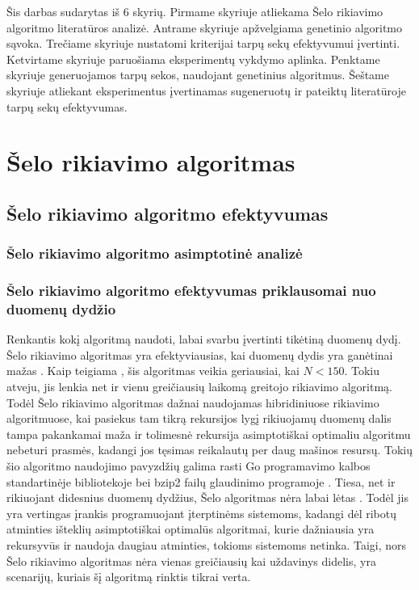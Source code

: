 \documentclass{VUMIFInfKursinis}
\begin{document}
Šis darbas sudarytas iš 6 skyrių.
Pirmame skyriuje atliekama Šelo rikiavimo algoritmo literatūros analizė.
Antrame skyriuje apžvelgiama genetinio algoritmo sąvoka.
Trečiame skyriuje nustatomi kriterijai tarpų sekų efektyvumui įvertinti.
Ketvirtame skyriuje paruošiama eksperimentų vykdymo aplinka.
Penktame skyriuje generuojamos tarpų sekos, naudojant genetinius algoritmus.
Šeštame skyriuje atliekant eksperimentus įvertinamas sugeneruotų ir pateiktų literatūroje tarpų sekų efektyvumas.

\section{Šelo rikiavimo algoritmas}

\subsection{Šelo rikiavimo algoritmo efektyvumas}

\subsubsection{Šelo rikiavimo algoritmo asimptotinė analizė}

\subsubsection{Šelo rikiavimo algoritmo efektyvumas priklausomai nuo duomenų dydžio}

Renkantis kokį algoritmą naudoti, labai svarbu įvertinti tikėtiną duomenų dydį.
Šelo rikiavimo algoritmas yra efektyviausias, kai duomenų dydis yra ganėtinai mažas \cite{ciura2001best}.
Kaip teigiama \cite{simpson1999faster}, šis algoritmas veikia geriausiai, kai $N < 150$.
Tokiu atveju, jis lenkia net ir vienu greičiausių laikomą greitojo rikiavimo algoritmą.
Todėl Šelo rikiavimo algoritmas dažnai naudojamas hibridiniuose rikiavimo algoritmuose, kai pasiekus tam tikrą rekursijos lygį
rikiuojamų duomenų dalis tampa pakankamai maža ir tolimesnė rekursija asimptotiškai optimaliu algoritmu nebeturi prasmės,
kadangi jos tęsimas reikalautų per daug mašinos resursų.
Tokių šio algoritmo naudojimo pavyzdžių galima rasti Go programavimo kalbos standartinėje bibliotekoje \cite{golangsort} bei
bzip2 failų glaudinimo programoje \cite{bzip2sort}.
Tiesa, net ir rikiuojant didesnius duomenų dydžius, Šelo algoritmas nėra labai lėtas \cite{ciura2001best}.
Todėl jis yra vertingas įrankis programuojant įterptinėms sistemoms, kadangi dėl ribotų atminties išteklių
asimptotiškai optimalūs algoritmai, kurie dažniausia yra rekursyvūs ir naudoja daugiau atminties, tokioms sistemoms netinka.
Taigi, nors Šelo rikiavimo algoritmas nėra vienas greičiausių kai uždavinys didelis,
yra scenarijų, kuriais šį algoritmą rinktis tikrai verta.
\end{document}
